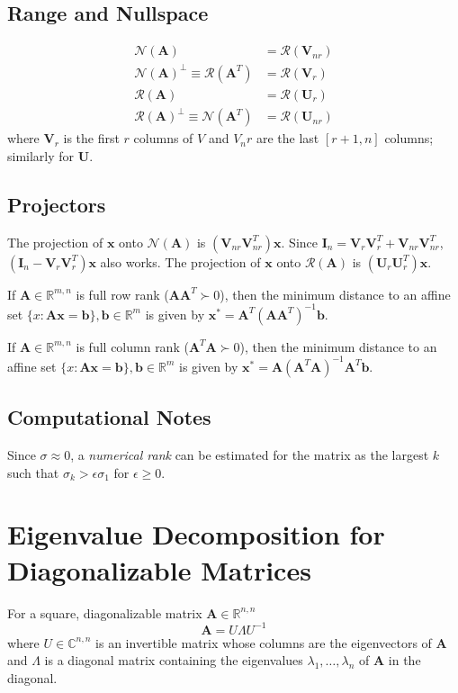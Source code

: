 \documentclass{book}
\newcommand{\mA}{\mathbf{A}}
\newcommand{\mI}{\mathbf{I}}
\newcommand{\mU}{\mathbf{U}}
\newcommand{\mV}{\mathbf{V}}
\newcommand{\vb}{\mathbf{b}}
\newcommand{\vx}{\mathbf{x}}
\newcommand{\sRm}{\mathbb{R}^{m}}
\newcommand{\sRmn}{\mathbb{R}^{m,n}}
\newcommand{\ispd}{\succ}
\newcommand{\ns}{\mathcal{N}}
\newcommand{\range}{\mathcal{R}}
\begin{document}
\subsection*{Range and Nullspace}
\begin{align}
\ns(\mA) &= \range(\mV_{nr})                      \\
\ns(\mA)^\perp \equiv\range(\mA^T)&=\range(\mV_r) \\
\range(\mA)&=\range(\mU_r)                        \\
\range(\mA)^\perp\equiv\ns(\mA^T)&=\range(\mU_{nr})
\end{align}
where $\mV_r$ is the first $r$ columns of $V$ and $V_nr$ are the last $[r+1,n]$ columns; similarly for $\mU$.


\subsection*{Projectors}
The projection of $\vx$ onto $\ns(\mA)$ is $(\mV_{nr}\mV_{nr}^T)\vx$. Since $\mI_n=\mV_r\mV_r^T+\mV_{nr}\mV_{nr}^T$, $(\mI_n-\mV_{r}\mV_{r}^T)\vx$ also works. The projection of $\vx$ onto $\range(\mA)$ is $(\mU_r\mU_r^T)\vx$.

If $\mA\in\sRmn$ is full row rank ($\mA\mA^T\ispd0$), then the minimum distance to an affine set $\{x:\mA\vx=\vb\}, \vb\in\sRm$ is given by $\vx^*=\mA^T(\mA\mA^T)^{-1}\vb$. %

If $\mA\in\sRmn$ is full column rank ($\mA^T\mA\ispd0$), then the minimum distance to an affine set $\{x:\mA\vx=\vb\}, \vb\in\sRm$ is given by $\vx^*=\mA(\mA^T\mA)^{-1}\mA^T\vb$. %


\subsection*{Computational Notes}
Since $\sigma\approx0$, a \textit{numerical rank} can be estimated for the matrix as the largest $k$ such that $\sigma_k>\epsilon \sigma_1$ for $\epsilon\ge0$.



\section{Eigenvalue Decomposition for Diagonalizable Matrices}

For a square, diagonalizable matrix $\mA\in\mathbb{R}^{n,n}$ 
\begin{equation}
\mA=U\Lambda U^{-1}
\end{equation}
where $U\in\mathbb{C}^{n,n}$ is an invertible matrix whose columns are the eigenvectors of $\mA$ and $\Lambda$ is a diagonal matrix containing the eigenvalues $\lambda_1,\ldots,\lambda_n$ of $\mA$ in the diagonal.
\end{document}
